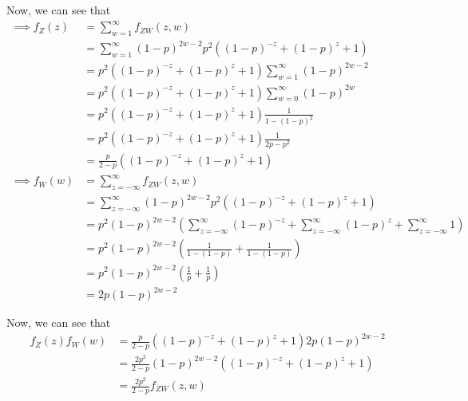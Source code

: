 Now, we can see that
\begin{align*}
    \implies
    f_{Z}(z)
     & =
    \sum_{w=1}^{\infty} f_{ZW}(z, w)
    \\ & =
    \sum_{w=1}^{\infty} {(1-p)}^{2w-2} p^{2} \left( {(1-p)}^{-z} + {(1-p)}^{z} + 1 \right)
    \\ & =
    p^{2} \left( {(1-p)}^{-z} + {(1-p)}^{z} + 1 \right) \sum_{w=1}^{\infty} {(1-p)}^{2w-2}
    \\ & =
    p^{2} \left( {(1-p)}^{-z} + {(1-p)}^{z} + 1 \right) \sum_{w=0}^{\infty} {(1-p)}^{2w}
    \\ & =
    p^{2} \left( {(1-p)}^{-z} + {(1-p)}^{z} + 1 \right) \frac{1}{{1-(1-p)^{2}}}
    \\ & =
    p^{2} \left( {(1-p)}^{-z} + {(1-p)}^{z} + 1 \right) \frac{1}{2p-p^{2}}
    \\ & =
    \frac{p}{2-p} \left( {(1-p)}^{-z} + {(1-p)}^{z} + 1 \right)
    \\
    \implies
    f_{W}(w)
     & =
    \sum_{z=-\infty}^{\infty} f_{ZW}(z, w)
    \\ & =
    \sum_{z=-\infty}^{\infty} {(1-p)}^{2w-2} p^{2} \left( {(1-p)}^{-z} + {(1-p)}^{z} + 1 \right)
    \\ & =
    p^{2} {(1-p)}^{2w-2} \left( \sum_{z=-\infty}^{\infty} {(1-p)}^{-z} + \sum_{z=-\infty}^{\infty} {(1-p)}^{z} + \sum_{z=-\infty}^{\infty} 1 \right)
    \\ & =
    p^{2} {(1-p)}^{2w-2} \left( \frac{1}{1-(1-p)} + \frac{1}{1-(1-p)} \right)
    \\ & =
    p^{2} {(1-p)}^{2w-2} \left( \frac{1}{p} + \frac{1}{p} \right)
    \\ & =
    2 p {(1-p)}^{2w-2}
\end{align*}

Now, we can see that
\begin{align*}
    f_{Z}(z) f_{W}(w)
     & =
    \frac{p}{2-p} \left( {(1-p)}^{-z} + {(1-p)}^{z} + 1 \right) 2 p {(1-p)}^{2w-2}
    \\ & =
    \frac{2p^{2}}{2-p} {(1-p)}^{2w-2} \left( {(1-p)}^{-z} + {(1-p)}^{z} + 1 \right)
    \\ & =
    \frac{2p^{2}}{2-p} f_{ZW}(z, w)
\end{align*}
